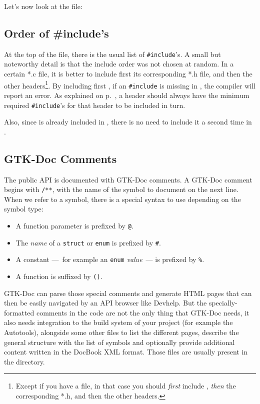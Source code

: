 Let's now look at the  file:

\vspace{0.7cm}


\subsection{Order of \#include's}
At the top of the file, there is the usual list of \lstinline{#include}'s. A small but noteworthy detail is that the include order was not chosen at random. In a certain *.c file, it is better to include first its corresponding *.h file, and then the other headers\footnote{Except if you have a  file, in that case you should \emph{first} include , \emph{then} the corresponding *.h, and then the other headers.}. By including first , if an \lstinline{#include} is missing in , the compiler will report an error. As explained on p.~\pageref{oop-include-in-header}, a header should always have the minimum required \lstinline{#include}'s for that header to be included in turn.

Also, since  is already included in , there is no need to include it a second time in .

\subsection{GTK-Doc Comments}
The public API is documented with GTK-Doc comments. A GTK-Doc comment begins with \lstinline{/**}, with the name of the symbol to document on the next line. When we refer to a symbol, there is a special syntax to use depending on the symbol type:
\begin{itemize}
  \item A function parameter is prefixed by \lstinline{@}.
  \item The \emph{name} of a \lstinline{struct} or \lstinline{enum} is prefixed by \lstinline{#}.
  \item A constant ---~for example an \lstinline{enum} \emph{value}~--- is prefixed by \lstinline{%}.
  \item A function is suffixed by \lstinline{()}.
\end{itemize}

GTK-Doc can parse those special comments and generate HTML pages that can then be easily navigated by an API browser like Devhelp. But the specially-formatted comments in the code are not the only thing that GTK-Doc needs, it also needs integration to the build system of your project (for example the Autotools), alongside some other files to list the different pages, describe the general structure with the list of symbols and optionally provide additional content written in the DocBook XML format. Those files are usually present in the  directory.

